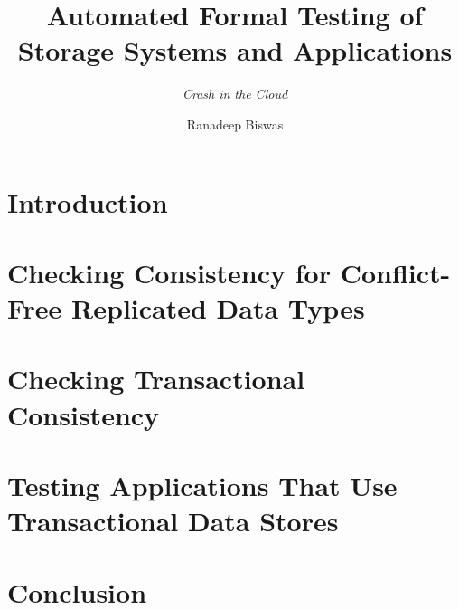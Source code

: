 \documentclass{mimosis}
\title{Automated Formal Testing of Storage Systems and Applications}
\subtitle{\emph{Crash in the Cloud}}
\author{Ranadeep Biswas}
\begin{document}
\frontmatter  
  
  


  \tableofcontents

\mainmatter

  \chapter{Introduction}

  

  \chapter{Checking Consistency for Conflict-Free Replicated Data Types}
  \label{chap:crdt}

  
  
  
  
  
  
  
  
  

  \chapter{Checking Transactional Consistency}
  \label{chap:txn}

  
%  
  
  
  
  
  

  \chapter{Testing Applications That Use Transactional Data Stores}
  \label{chap:dist-app}

  
  
  
  
  
  
  
  
  

  \chapter{Conclusion}
  

\backmatter


  \printindex
  \printbibliography
\end{document}
